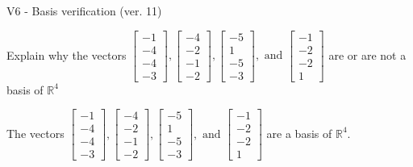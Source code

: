 \begin{exercise}
  \begin{exerciseTitle}V6 - Basis verification (ver. 11)\end{exerciseTitle}
  \begin{exerciseStatement}
    Explain why the vectors \(\left[\begin{array}{r}
-1 \\
-4 \\
-4 \\
-3
\end{array}\right] , \left[\begin{array}{r}
-4 \\
-2 \\
-1 \\
-2
\end{array}\right] , \left[\begin{array}{r}
-5 \\
1 \\
-5 \\
-3
\end{array}\right] , \text{ and } \left[\begin{array}{r}
-1 \\
-2 \\
-2 \\
1
\end{array}\right]\) are or are not a basis of \(\mathbb{R}^4\)	


  \end{exerciseStatement}
  \begin{exerciseAnswer}
   The vectors \(\left[\begin{array}{r}
-1 \\
-4 \\
-4 \\
-3
\end{array}\right] , \left[\begin{array}{r}
-4 \\
-2 \\
-1 \\
-2
\end{array}\right] , \left[\begin{array}{r}
-5 \\
1 \\
-5 \\
-3
\end{array}\right] , \text{ and } \left[\begin{array}{r}
-1 \\
-2 \\
-2 \\
1
\end{array}\right]\) 
  	 are  a basis of \(\mathbb{R}^4\).
  


  \end{exerciseAnswer}
\end{exercise}